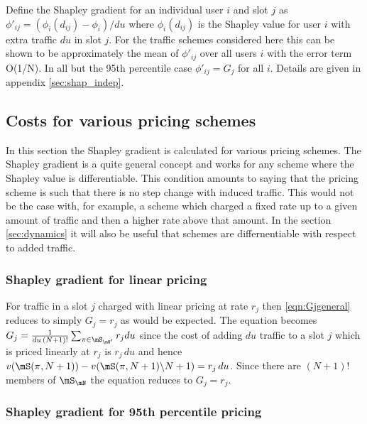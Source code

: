 Define the Shapley gradient for an individual user $i$ and
slot $j$ as 
$\phi'_{ij}= (\phi_i(d_{ij}) - \phi_i) / du$ where
$\phi_i(d_{ij})$ is the Shapley value for user $i$ with
extra traffic $du$ in slot $j$. For the traffic schemes considered
here this can be shown to be approximately
the mean of $\phi'_{ij}$ over all users $i$ with 
the error term O(1/N).  In
all but the 95th percentile case $\phi'_{ij} = G_j$ for all
$i$.  Details are given in appendix \ref{sec:shap_indep}.

\subsection{Costs for various pricing schemes}


In this section the Shapley gradient is calculated for various
pricing schemes.  The Shapley gradient is a quite general
concept and works for any scheme where the Shapley value
is differentiable.  This condition amounts to saying that the
pricing scheme is such that there is no step change with
induced traffic.  This would not be the case with, for example,
a scheme which charged a fixed rate up to a given amount of
traffic and then a higher rate above that amount.
In the section \ref{sec:dynamics} it will also be useful
that schemes are differnentiable with respect to added traffic.

\subsubsection{Shapley gradient for linear pricing}
\label{sec:linear_price}

For traffic in a slot $j$ charged with 
linear pricing at rate $r_j$ then 
\eqref{eqn:Gjgeneral} reduces to simply $G_j = r_j$ as
would be expected.  
The equation becomes 
$G_j = \frac{1}{du \, (N+1)!} 
\sum_{\pi \in \mS_{\mN'}}  r_j du$
since the cost of adding $du$ traffic to a slot $j$ which
is priced linearly at $r_j$ is $r_j \, du$ and hence
$v(\mS(\pi,N+1)) - 
v(\mS(\pi,N+1) \backslash N+1) = r_j \, du$.
Since there are
$(N+1)!$ members of $\mS_{\mN}$ the equation reduces
to $G_j = r_j$.  

\subsubsection{Shapley gradient for 95th percentile pricing}
\label{sec:shap95}

